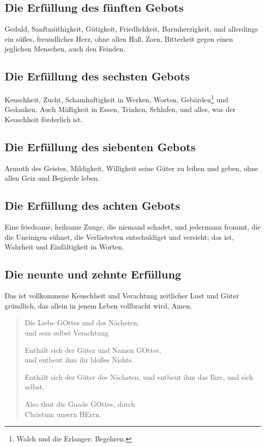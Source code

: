 \subsection{Die Erfüllung des fünften Gebots}

Geduld, Sanftmüthigkeit, Gütigkeit, Friedlichkeit, Barmherzigkeit, und allerdings ein süßes, freundliches Herz, ohne allen Haß, Zorn, Bitterkeit gegen einen jeglichen Menschen, auch den Feinden.

\subsection{Die Erfüllung des sechsten Gebots}

Keuschheit, Zucht, Schamhaftigkeit in Werken, Worten, Gebärden\footnote{Walch und die Erlanger: Begehren.} und Gedanken. Auch Mäßigkeit in Essen, Trinken, Schlafen, und alles, was der Keuschheit förderlich ist.

\subsection{Die Erfüllung des siebenten Gebots}

Armuth des Geistes, Mildigkeit, Willigkeit seine Güter zu leihen und geben, ohne allen Geiz und Begierde leben.

\subsection{Die Erfüllung des achten Gebots}

Eine friedsame, heilsame Zunge, die niemand schadet, und jedermann frommt, die die Uneinigen sühnet, die Verlästerten entschuldiget und versieht; das ist, Wahrheit und Einfältigkeit in Worten.

\subsection{Die neunte und zehnte Erfüllung}

Das ist vollkommene Keuschheit und Verachtung zeitlicher Lust und Güter gründlich, das allein in jenem Leben vollbracht wird, Amen.

\begin{verse}
Die Liebe GOttes und des Nächsten,\\
und sein selbst Verachtung.

Enthält sich der Güter und Namen GOttes,\\
und entbeut ihm ihr bloßes Nichts.

Enthält sich der Güter des Nächsten, und entbeut ihm das Ihre, und sich selbst.

Also thut die Gnade GOttes, durch\\
Christum unsern HErrn.
\end{verse}


